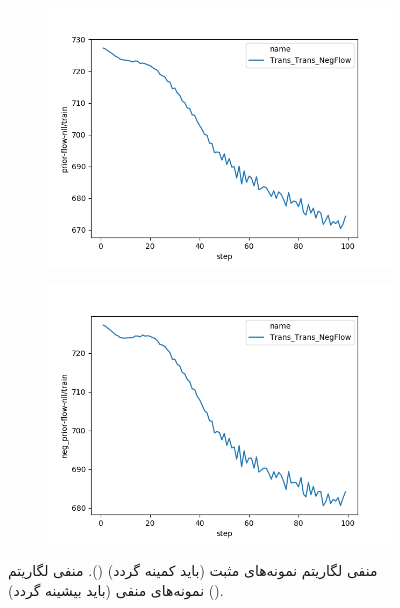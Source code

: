 	\begin{figure}[h]
		\centering
		\begin{subfigure}[t]{0.3\textheight}
			\centering
			\includegraphics[width=1.\textwidth]{images/figs/2019_12_31__11_06_03__prior-flow-nll.png}
			\caption{}
			\label{fig:chap4:negprior_prior_nll}
		\end{subfigure}
		\begin{subfigure}[t]{0.3\textheight}
			\centering
			\includegraphics[width=1.\textwidth]{images/figs/2019_12_31__11_06_03__neg_prior-flow-nll.png}
			\caption{}
			\label{fig:chap4:negprior_negprior_nll}
		\end{subfigure}
		\caption{
			منفی لگاریتم \likelihood{} نمونه‌های مثبت (باید کمینه گردد)
			().
			منفی لگاریتم \likelihood{} نمونه‌های منفی (باید بیشینه گردد)
			().
		}
		\label{fig:chap4:negprior}
	\end{figure}
